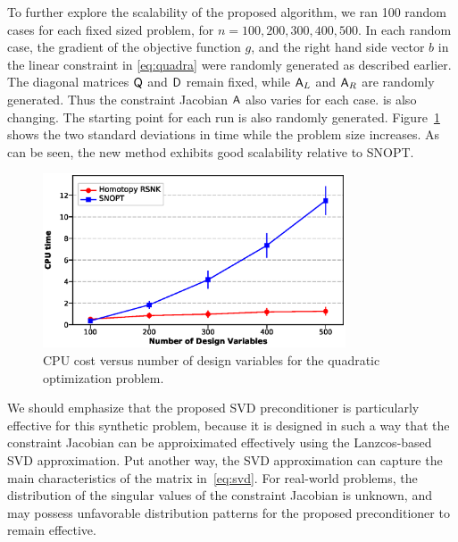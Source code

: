 To further explore the scalability of the proposed algorithm, we ran 100 random cases for 
each fixed sized problem, for $n = 100, 200, 300, 400, 500$.  In each random case, the gradient 
of the objective function $g$, and the right hand side vector $b$ in the linear constraint in \eqref{eq:quadra} 
were randomly generated as described earlier. The diagonal matrices $\mathsf{Q}$ and $\mathsf{D}$ remain fixed, while $\mathsf{A}_L$ and $\mathsf{A}_R$ are randomly generated. Thus the constraint Jacobian $\mathsf{A}$ 
also varies for each case. 
is also changing. The starting point for each run is also randomly generated. Figure~\ref{fig:quad_scale} shows the two standard deviations in time while
the problem size increases. As can be seen, the new method exhibits good scalability relative to SNOPT. 

\begin{figure}[tbp]
  \centering
  \includegraphics[clip,width=0.8\textwidth]{./figs/chap4_test/random_100_color.eps}%
  \caption{CPU cost versus number of design variables for the quadratic
    optimization problem.\label{fig:quad_scale}}
\end{figure}

We should emphasize that the proposed SVD preconditioner is particularly effective for this synthetic problem, because it is designed in such a way that the constraint Jacobian can be approiximated effectively using the Lanzcos-based SVD approximation.
Put another way, the SVD approximation can capture the main characteristics of the matrix in~\eqref{eq:svd}. For real-world problems, the distribution of the singular values of the constraint Jacobian is unknown, and may possess unfavorable distribution patterns for the proposed preconditioner to remain effective.



